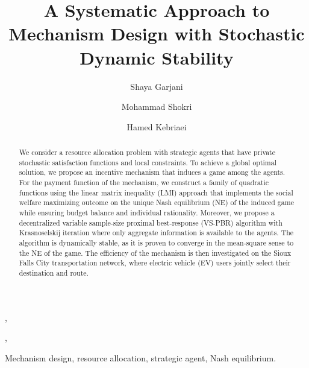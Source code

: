 \documentclass[twocolumn]{autart}
\begin{document}
\begin{frontmatter}

\title{A Systematic Approach to Mechanism Design with Stochastic Dynamic Stability}
                                              


\author{Shaya Garjani},
\author{Mohammad Shokri},
\author{Hamed Kebriaei}


\address{School of Electrical and Computer Engineering, College of Engineering, University of Tehran, Tehran, Iran}  

          
\begin{keyword}                           
Mechanism design, resource allocation, strategic agent, Nash equilibrium.               
\end{keyword}                            


\begin{abstract}                          
We consider a resource allocation problem with strategic agents that have private stochastic satisfaction functions and local constraints. To achieve a global optimal solution, we propose an incentive mechanism that induces a game among the agents. For the payment function of the mechanism, we construct a family of quadratic functions using the linear matrix inequality (LMI) approach that implements the social welfare maximizing outcome on the unique Nash equilibrium (NE) of the induced game while ensuring budget balance and individual rationality. Moreover, we propose a decentralized variable sample-size proximal best-response (VS-PBR) algorithm with Krasnoselskij iteration where only aggregate information is available to the agents. The algorithm is dynamically stable, as it is proven to converge in the mean-square sense to the NE of the game. The efficiency of the mechanism is then investigated on the Sioux Falls City transportation network, where electric vehicle (EV) users jointly select their destination and route.
\end{abstract}

\end{frontmatter}
\end{document}
